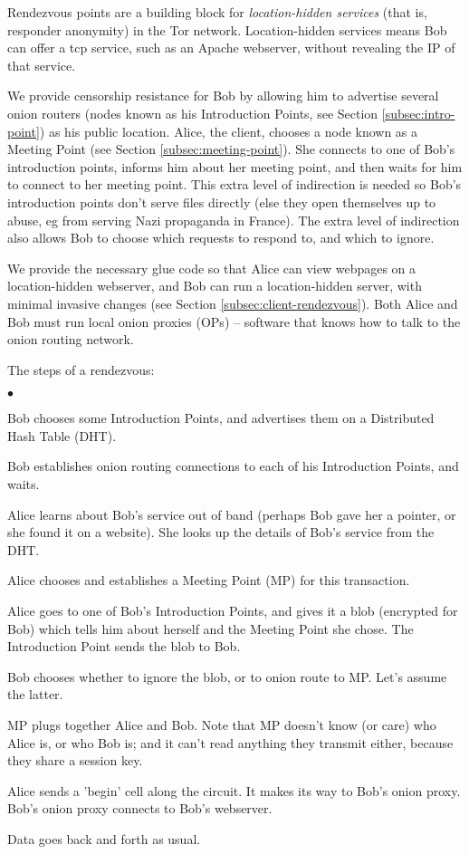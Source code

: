 \documentclass[times,10pt,twocolumn]{article}
\newenvironment{tightlist}{\begin{list}{$\bullet$}{
  \setlength{\itemsep}{0mm}
    \setlength{\parsep}{0mm}
    }}{\end{list}}
\begin{document}
\label{sec:rendezvous}

Rendezvous points are a building block for \emph{location-hidden services}
(that is, responder anonymity) in the Tor network. Location-hidden
services means Bob can offer a tcp service, such as an Apache webserver,
without revealing the IP of that service.

We provide censorship resistance for Bob by allowing him to advertise
several onion routers (nodes known as his Introduction Points, see
Section \ref{subsec:intro-point}) as his public location. Alice,
the client, chooses a node known as a Meeting Point (see Section
\ref{subsec:meeting-point}). She connects to one of Bob's introduction
points, informs him about her meeting point, and then waits for him to
connect to her meeting point. This extra level of indirection is needed
so Bob's introduction points don't serve files directly (else they open
themselves up to abuse, eg from serving Nazi propaganda in France). The
extra level of indirection also allows Bob to choose which requests to
respond to, and which to ignore.

We provide the necessary glue code so that Alice can view
webpages on a location-hidden webserver, and Bob can run a
location-hidden server, with minimal invasive changes (see Section
\ref{subsec:client-rendezvous}). Both Alice and Bob must run local
onion proxies (OPs) -- software that knows how to talk to the onion
routing network.

The steps of a rendezvous:
\begin{tightlist}
\item Bob chooses some Introduction Points, and advertises them on a
      Distributed Hash Table (DHT).
\item Bob establishes onion routing connections to each of his
      Introduction Points, and waits.
\item Alice learns about Bob's service out of band (perhaps Bob gave her
      a pointer, or she found it on a website). She looks up the details
      of Bob's service from the DHT.
\item Alice chooses and establishes a Meeting Point (MP) for this
      transaction.
\item Alice goes to one of Bob's Introduction Points, and gives it a blob
      (encrypted for Bob) which tells him about herself and the Meeting
      Point she chose. The Introduction Point sends the blob to Bob.
\item Bob chooses whether to ignore the blob, or to onion route to MP.
      Let's assume the latter.
\item MP plugs together Alice and Bob. Note that MP doesn't know (or care)
      who Alice is, or who Bob is; and it can't read anything they
      transmit either, because they share a session key.
\item Alice sends a 'begin' cell along the circuit. It makes its way
      to Bob's onion proxy. Bob's onion proxy connects to Bob's webserver.
\item Data goes back and forth as usual.
\end{tightlist}
\end{document}
